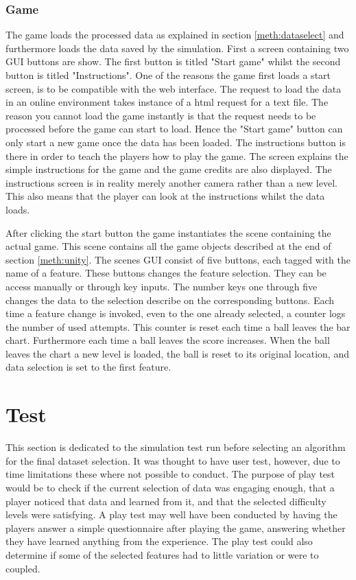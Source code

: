 \documentclass[a4paper,11pt]{article}
\begin{document}
\subsubsection{Game}
\label{meth:implemgame}
The game loads the processed data as explained in section \ref{meth:dataselect} and furthermore loads the data saved by the simulation. First a screen containing two GUI buttons are show. The first button is titled "Start game" whilst the second button is titled "Instructions". One of the reasons the game first loads a start screen, is to be compatible with the web interface. The request to load the data in an online environment takes instance of a html request for a text file. The reason you cannot load the game instantly is that the request needs to be processed before the game can start to load. Hence the "Start game" button can only start a new game once the data has been loaded. The instructions button is there in order to teach the players how to play the game. The screen explains the simple instructions for the game and the game credits are also displayed. The instructions screen is in reality merely another camera rather than a new level. This also means that the player can look at the instructions whilst the data loads. 

After clicking the start button the game instantiates the scene containing the actual game. This scene contains all the game objects described at the end of section \ref{meth:unity}. The scenes GUI consist of five buttons, each tagged with the name of a feature. These buttons changes the feature selection. They can be access manually or through key inputs. The number keys one through five changes the data to the selection describe on the corresponding buttons. Each time a feature change is invoked, even to the one already selected, a counter logs the number of used attempts. This counter is reset each time a ball leaves the bar chart. Furthermore each time a ball leaves the score increases. When the ball leaves the chart a new level is loaded, the ball is reset to its original location, and data selection is set to the first feature.
\section{Test}
This section is dedicated to the simulation test run before selecting an algorithm for the final dataset selection. It was thought to have user test, however, due to time limitations these where not possible to conduct. The purpose of play test would be to check if the current selection of data was engaging enough, that a player noticed that data and learned from it, and that the selected difficulty levels were satisfying. A play test may well have been conducted by having the players answer a simple questionnaire after playing the game, answering whether they have learned anything from the experience. The play test could also determine if some of the selected features had to little variation or were to coupled. 
\end{document}
